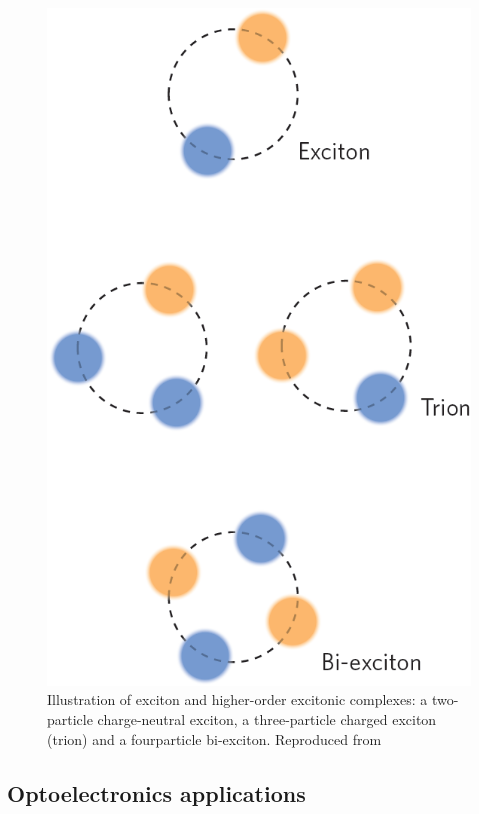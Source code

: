 \begin{figure}[!h]
	\begin{center}
		\includegraphics[scale=0.35]{TMDCQuasiparticles.png}
		\caption{Illustration of exciton and higher-order excitonic complexes: a two-particle charge-neutral exciton, a three-particle charged exciton (trion) and a fourparticle bi-exciton. Reproduced from \cite{Mak2016}}
		\label{fig:TMDCQuasiparticles}
	\end{center}
\end{figure}


\subsection{Optoelectronics applications} 


